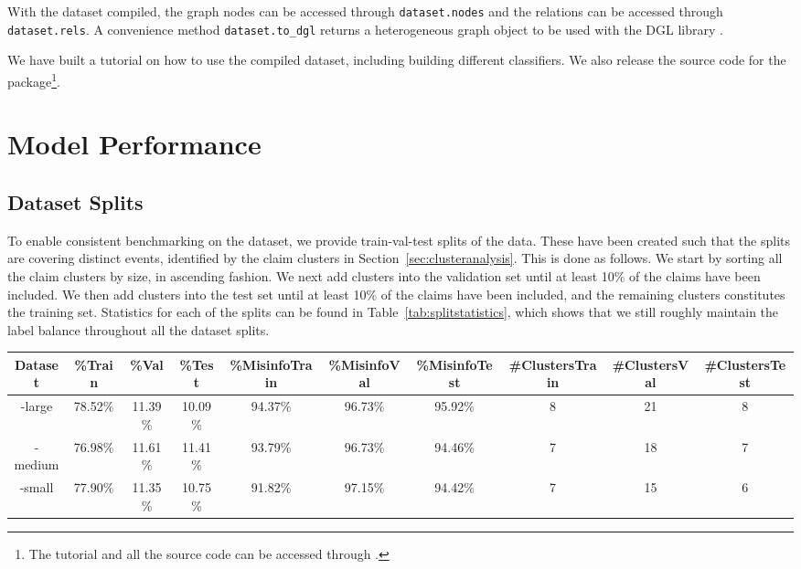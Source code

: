 \documentclass[sigconf,natbib=true,anonymous=false,nonacm]{acmart}
\begin{document}
With the dataset compiled, the graph nodes can be accessed through
\texttt{dataset.nodes} and the relations can be accessed through
\texttt{dataset.rels}. A convenience method \texttt{dataset.to\_dgl} returns a
heterogeneous graph object to be used with the DGL library \cite{wang2019dgl}.

We have built a tutorial on how to use the compiled dataset, including building
different classifiers. We also release the source code for the \pkgname
package\footnote{The tutorial and all the source code can be accessed through
\dataseturl.}.


\section{Model Performance}
\label{sec:modelperformance}

\subsection{Dataset Splits}
\label{sec:datasetsplits}
To enable consistent benchmarking on the dataset, we provide train-val-test
splits of the data. These have been created such that the splits are covering
distinct events, identified by the claim clusters in
Section~\ref{sec:clusteranalysis}. This is done as follows. We start by sorting
all the claim clusters by size, in ascending fashion. We next add clusters into
the validation set until at least 10\% of the claims have been included. We
then add clusters into the test set until at least 10\% of the claims have been
included, and the remaining clusters constitutes the training set. Statistics
for each of the splits can be found in Table~\ref{tab:splitstatistics}, which
shows that we still roughly maintain the label balance throughout all the
dataset splits.

\begin{table*}[ht!]
	\caption{Dataset split statistics}
    \begin{center}
        \begin{tabular}{c|ccc|ccc|ccc}
            \toprule
			Dataset & \%Train & \%Val & \%Test & \%MisinfoTrain & \%MisinfoVal &
                \%MisinfoTest & \#ClustersTrain & \#ClustersVal &
                \#ClustersTest \\
			\midrule
			\datasetname-large & 78.52\% & 11.39\% & 10.09\% & 94.37\% & 96.73\% &
                95.92\% & 8 & 21 & 8 \\
			\datasetname-medium & 76.98\% & 11.61\% & 11.41\% & 93.79\% & 96.73\% &
                94.46\% & 7 & 18 & 7 \\
			\datasetname-small & 77.90\% & 11.35\% & 10.75\% & 91.82\% & 97.15\% &
                94.42\% & 7 & 15 & 6 \\
            \bottomrule
        \end{tabular}
        \label{tab:splitstatistics}
    \end{center}
\end{table*}
\end{document}
